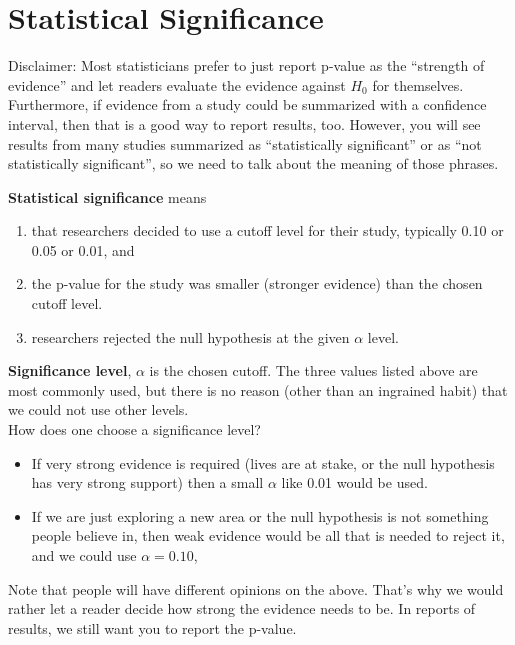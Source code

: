 \def\theTopic{Reading 11}


\section{ Statistical Significance}

Disclaimer:  Most statisticians prefer to just report p-value as the
``strength of evidence'' and let readers evaluate the evidence against
$H_0$ for themselves.  Furthermore, if evidence from a study could be
summarized with a confidence interval, then that is a good way to
report results, too.  However, you will see results from many studies
summarized as ``statistically significant''  or as ``not statistically
significant'', so we need to talk about the meaning of those phrases.

{\bf Statistical significance} means
\begin{enumerate}
\item that researchers decided to use a  cutoff level for their study,
  typically 0.10 or 0.05 or 0.01, and
\item the p-value for the study was smaller (stronger evidence) than
  the chosen cutoff level.
\item researchers rejected the null hypothesis at the given $\alpha$
  level. 
\end{enumerate}

{\bf Significance level}, $\alpha$ is the chosen cutoff. The three
values listed above are most commonly used, but there is no reason
(other than an ingrained habit) that we could not use other levels.\\
How does one choose a significance level?
\begin{itemize}
  \item If very strong evidence is required (lives are at stake, or
    the null hypothesis has very strong support) then a small $\alpha$
    like 0.01 would be used.
  \item If we are just exploring a new area or the null hypothesis is
    not something people believe in, then weak evidence would be all
    that is needed to reject it, and we could use $\alpha = 0.10$,
\end{itemize}
 Note that people will have different opinions on the above.  That's
 why we would rather let a reader decide how strong the evidence needs
 to be.  In reports of results, we still want you to report the
 p-value. 

